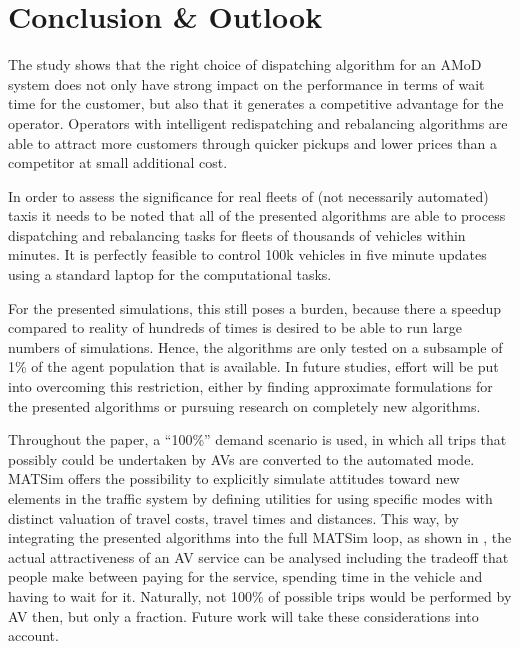 \section{Conclusion \& Outlook}
\label{sec:Conclusion}

The study shows that the right choice of dispatching algorithm for an AMoD system
does not only have strong impact on the performance in terms of wait time for
the customer, but also that it generates a competitive advantage for the
operator. Operators with intelligent redispatching and rebalancing algorithms are able to attract
more customers through quicker pickups and lower prices than a competitor at small additional cost.

In order to assess the significance for real fleets of (not necessarily
automated) taxis it needs to be noted that all of the presented algorithms are
able to process dispatching and rebalancing tasks for fleets of thousands of
vehicles within minutes. It is perfectly feasible to control 100k vehicles in
five minute updates using a standard laptop for the computational tasks.

For the presented simulations, this still poses a burden, because there
a speedup compared to reality of hundreds of times is desired to be able
to run large numbers of simulations. Hence, the algorithms
are only tested on a subsample of 1\% of the agent population that is available.
In future studies, effort will be put into overcoming this restriction, either
by finding approximate formulations for the presented algorithms or pursuing research
on completely new algorithms.

Throughout the paper, a ``100\%'' demand scenario is used, in which all
trips that possibly could be undertaken by AVs are converted to the automated
mode. MATSim offers the possibility to explicitly
simulate attitudes toward new elements in the traffic system by defining utilities
for using specific modes with distinct valuation of travel costs, travel times and
distances. This way, by integrating the presented algorithms into the full
MATSim loop, as shown in \cite{horl_abmtrans17}, the actual attractiveness of an
AV service can be analysed including the tradeoff that people make between
paying for the service, spending time in the vehicle and having to wait for it.
Naturally, not 100\% of possible trips would be performed by AV then, but only
a fraction. Future work will take these considerations into account.
